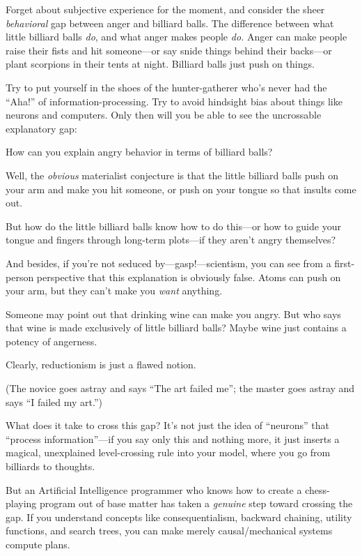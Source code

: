 {
 Forget about subjective experience for the moment, and consider
the sheer \textit{behavioral} gap between anger and billiard balls. The
difference between what little billiard balls \textit{do}, and what
anger makes people \textit{do.} Anger can make people raise their fists
and hit someone---or say snide things behind their backs---or plant
scorpions in their tents at night. Billiard balls just push on things.}

{
 Try to put yourself in the shoes of the hunter-gatherer
who's never had the
``Aha!'' of information-processing.
Try to avoid hindsight bias about things like neurons and computers.
Only then will you be able to see the uncrossable explanatory gap:}

{
 How can you explain angry behavior in terms of billiard balls?}

{
 Well, the \textit{obvious} materialist conjecture is that the
little billiard balls push on your arm and make you hit someone, or
push on your tongue so that insults come out.}

{
 But how do the little billiard balls know how to do this---or how
to guide your tongue and fingers through long-term plots---if they
aren't angry themselves?}

{
 And besides, if you're not seduced
by---gasp!---scientism, you can see from a first-person perspective
that this explanation is obviously false. Atoms can push on your arm,
but they can't make you \textit{want} anything.}

{
 Someone may point out that drinking wine can make you angry. But
who says that wine is made exclusively of little billiard balls? Maybe
wine just contains a potency of angerness.}

{
 Clearly, reductionism is just a flawed notion.}

{
 (The novice goes astray and says ``The art failed
me''; the master goes astray and says
``I failed my art.'')}

{
 What does it take to cross this gap? It's not just
the idea of ``neurons'' that
``process information''---if you say
only this and nothing more, it just inserts a magical, unexplained
level-crossing rule into your model, where you go from billiards to
thoughts.}

{
 But an Artificial Intelligence programmer who knows how to create
a chess-playing program out of base matter has taken a \textit{genuine}
step toward crossing the gap. If you understand concepts like
consequentialism, backward chaining, utility functions, and search
trees, you can make merely causal/mechanical systems compute plans.}

